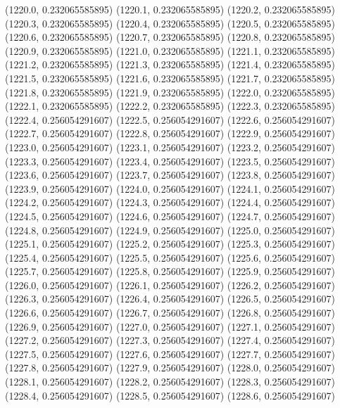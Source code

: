{					(1220.0, 0.232065585895)
					(1220.1, 0.232065585895)
					(1220.2, 0.232065585895)
					(1220.3, 0.232065585895)
					(1220.4, 0.232065585895)
					(1220.5, 0.232065585895)
					(1220.6, 0.232065585895)
					(1220.7, 0.232065585895)
					(1220.8, 0.232065585895)
					(1220.9, 0.232065585895)
					(1221.0, 0.232065585895)
					(1221.1, 0.232065585895)
					(1221.2, 0.232065585895)
					(1221.3, 0.232065585895)
					(1221.4, 0.232065585895)
					(1221.5, 0.232065585895)
					(1221.6, 0.232065585895)
					(1221.7, 0.232065585895)
					(1221.8, 0.232065585895)
					(1221.9, 0.232065585895)
					(1222.0, 0.232065585895)
					(1222.1, 0.232065585895)
					(1222.2, 0.232065585895)
					(1222.3, 0.232065585895)
					(1222.4, 0.256054291607)
					(1222.5, 0.256054291607)
					(1222.6, 0.256054291607)
					(1222.7, 0.256054291607)
					(1222.8, 0.256054291607)
					(1222.9, 0.256054291607)
					(1223.0, 0.256054291607)
					(1223.1, 0.256054291607)
					(1223.2, 0.256054291607)
					(1223.3, 0.256054291607)
					(1223.4, 0.256054291607)
					(1223.5, 0.256054291607)
					(1223.6, 0.256054291607)
					(1223.7, 0.256054291607)
					(1223.8, 0.256054291607)
					(1223.9, 0.256054291607)
					(1224.0, 0.256054291607)
					(1224.1, 0.256054291607)
					(1224.2, 0.256054291607)
					(1224.3, 0.256054291607)
					(1224.4, 0.256054291607)
					(1224.5, 0.256054291607)
					(1224.6, 0.256054291607)
					(1224.7, 0.256054291607)
					(1224.8, 0.256054291607)
					(1224.9, 0.256054291607)
					(1225.0, 0.256054291607)
					(1225.1, 0.256054291607)
					(1225.2, 0.256054291607)
					(1225.3, 0.256054291607)
					(1225.4, 0.256054291607)
					(1225.5, 0.256054291607)
					(1225.6, 0.256054291607)
					(1225.7, 0.256054291607)
					(1225.8, 0.256054291607)
					(1225.9, 0.256054291607)
					(1226.0, 0.256054291607)
					(1226.1, 0.256054291607)
					(1226.2, 0.256054291607)
					(1226.3, 0.256054291607)
					(1226.4, 0.256054291607)
					(1226.5, 0.256054291607)
					(1226.6, 0.256054291607)
					(1226.7, 0.256054291607)
					(1226.8, 0.256054291607)
					(1226.9, 0.256054291607)
					(1227.0, 0.256054291607)
					(1227.1, 0.256054291607)
					(1227.2, 0.256054291607)
					(1227.3, 0.256054291607)
					(1227.4, 0.256054291607)
					(1227.5, 0.256054291607)
					(1227.6, 0.256054291607)
					(1227.7, 0.256054291607)
					(1227.8, 0.256054291607)
					(1227.9, 0.256054291607)
					(1228.0, 0.256054291607)
					(1228.1, 0.256054291607)
					(1228.2, 0.256054291607)
					(1228.3, 0.256054291607)
					(1228.4, 0.256054291607)
					(1228.5, 0.256054291607)
					(1228.6, 0.256054291607)
}
